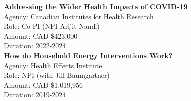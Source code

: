 \documentclass[
  letterpaper,
  DIV=11,
  numbers=noendperiod]{scrartcl}
\begin{document}
\textbf{Addressing the Wider Health Impacts of COVID-19}\\
\hspace*{0.333em}\hspace*{0.333em}\hspace*{0.333em}Agency: Canadian
Institutes for Health Research\\
\hspace*{0.333em}\hspace*{0.333em}\hspace*{0.333em}Role: Co-PI (NPI
Arijit Nandi)\\
\hspace*{0.333em}\hspace*{0.333em}\hspace*{0.333em}Amount: CAD
\$423,000\\
\hspace*{0.333em}\hspace*{0.333em}\hspace*{0.333em}Duration: 2022-2024\\

\textbf{How do Household Energy Interventions Work?}\\
\hspace*{0.333em}\hspace*{0.333em}\hspace*{0.333em}Agency: Health
Effects Institute\\
\hspace*{0.333em}\hspace*{0.333em}\hspace*{0.333em}Role: NPI (with Jill
Baumgartner)\\
\hspace*{0.333em}\hspace*{0.333em}\hspace*{0.333em}Amount: CAD
\$1,019,956\\
\hspace*{0.333em}\hspace*{0.333em}\hspace*{0.333em}Duration: 2019-2024\\
\end{document}
